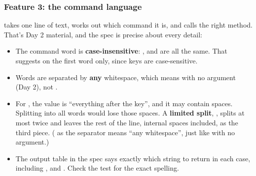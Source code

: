 \documentclass[10pt,a4paper]{article}
\begin{document}
\subsubsection{Feature 3: the command language}
 takes one line of text, works out which command it is, and calls the right method. That’s Day 2 material, and the spec is precise about every detail:
\begin{itemize}
\item The command word is \textbf{case-insensitive}: ,  and  are all the same. That suggests  on the first word only, since keys are case-sensitive.
\item Words are separated by \textbf{any} whitespace, which means  with no argument (Day 2), not .
\item For , the value is “everything after the key”, and it may contain spaces. Splitting into all words would lose those spaces. A \textbf{limited split}, , splits at most twice and leaves the rest of the line, internal spaces included, as the third piece. ( as the separator means “any whitespace”, just like  with no argument.)
\item The output table in the spec says exactly which string to return in each case, including ,  and . Check the test for the exact spelling.
\end{itemize}
\end{document}
